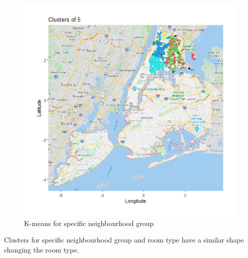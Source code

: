 \documentclass{FR16}
\begin{document}
\begin{figure}[!htb]
\begin{minipage}{0.33\textwidth}
   \end{minipage}
   \begin{minipage}{0.33\textwidth}
     \centering
     \includegraphics[width=1\linewidth]{figures/clust-5.png}
   \end{minipage}
        \caption{K-means for specific neighbourhood group}\label{fig:24}
\end{figure}
\newpage
\noindent 
Clusters for specific neighbourhood group and room type have a similar shape changing the room type. 
\end{document}
